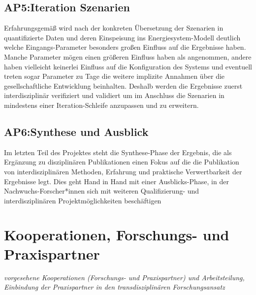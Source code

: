 \documentclass[a4paper,11pt,twoside]{scrartcl}
\begin{document}
\subsection*{AP5:Iteration Szenarien}
Erfahrungsgemäß wird nach der konkreten Übersetzung der Szenarien in quantifizierte Daten und deren Einspeisung ins Energiesystem-Modell deutlich welche Eingangs-Parameter besonders großen Einfluss auf die Ergebnisse haben. Manche Parameter mögen einen größeren Einfluss haben als angenommen, andere haben vielleicht keinerlei Einfluss auf die Konfiguration des Systems und eventuell treten sogar Parameter zu Tage die weitere implizite Annahmen über die gesellschaftliche Entwicklung beinhalten. Deshalb werden die Ergebnisse zuerst interdisziplinär verifiziert und validiert um im Anschluss die Szenarien in mindestens einer Iteration-Schleife anzupassen und zu erweitern.

\subsection*{AP6:Synthese und Ausblick}
Im letzten Teil des Projektes steht die Synthese-Phase der Ergebnis, die als Ergänzung zu disziplinären Publikationen einen Fokus auf die die Publikation von interdisziplinären Methoden, Erfahrung und praktische Verwertbarkeit der Ergebnisse legt. Dies geht Hand in Hand mit einer Ausblicks-Phase, in der Nachwuchs-Forscher*innen sich mit weiteren Qualifizierung- und interdisziplinären Projektmöglichkeiten beschäftigen

\section{Kooperationen, Forschungs- und Praxispartner}
\textit{vorgesehene Kooperationen (Forschungs- und Praxispartner) und Arbeitsteilung, Einbindung der Praxispartner in den transdisziplinären Forschungsansatz}\\
\end{document}
